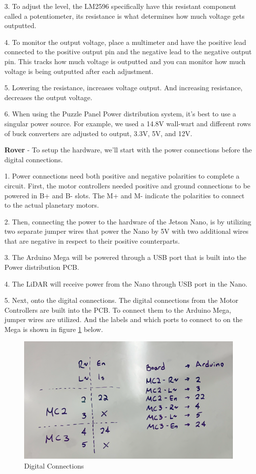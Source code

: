 \documentclass[a4paper, 10pt]{article}
\begin{document}
3. To adjust the level, the LM2596 specifically have this resistant component called a potentiometer, its resistance is what determines how much voltage gets outputted. 

4. To monitor the output voltage, place a multimeter and have the positive lead connected to the positive output pin and the negative lead to the negative output pin. This tracks how much voltage is outputted and you can monitor how much voltage is being outputted after each adjustment.

5. Lowering the resistance, increases voltage output. And increasing resistance, decreases the output voltage. 

6. When using the Puzzle Panel Power distribution system, it's best to use a singular power source. For example, we used a 14.8V wall-wart and different rows of buck converters are adjusted to output, 3.3V, 5V, and 12V.

\textbf{Rover} - To setup the hardware, we'll start with the power connections before the digital connections.

1. Power connections need both positive and negative polarities to complete a circuit. First, the motor controllers needed positive and ground connections to be powered in B+ and B- slots. The M+ and M- indicate the polarities to connect to the actual planetary motors. 

2. Then, connecting the power to the hardware of the Jetson Nano, is by utilizing two separate jumper wires that power the Nano by 5V with two additional wires that are negative in respect to their positive counterparts.  

3. The Arduino Mega will be powered through a USB port that is built into the Power distribution PCB.

4. The LiDAR will receive power from the Nano through USB port in the Nano.

5. Next, onto the digital connections. The digital connections from the Motor Controllers are built into the PCB. To connect them to the Arduino Mega, jumper wires are utilized. And the labels and which ports to connect to on the Mega is shown in figure \ref{dig_con} below.

	\begin{figure} [!h]
			\centering
			\includegraphics[scale=0.5]{Photos/Digital Connections from Motor Controller to Arduino Mega}
			\caption{Digital Connections}
			\label{dig_con}
	\end{figure}
\end{document}
